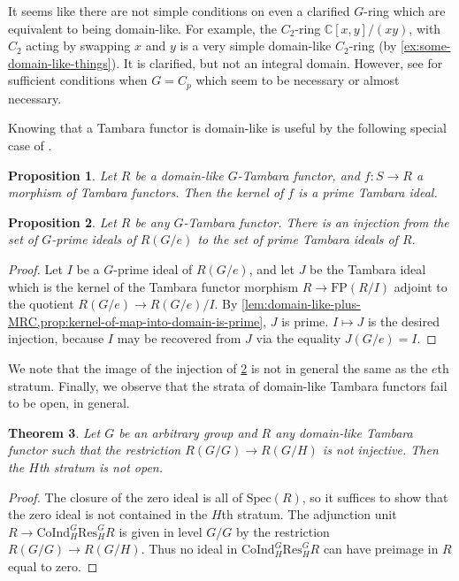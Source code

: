 \documentclass[11pt,dvipsnames]{amsart}
\newtheorem{theorem}{Theorem}[section]
\newtheorem{proposition}[theorem]{Proposition}
\theoremstyle{BoldRemark}
\newcommand{\Res}{\mathrm{Res}}
\newcommand{\Spec}{\mathrm{Spec}}
\newcommand{\Coind}{\mathrm{CoInd}}
\begin{document}
It seems like there are not simple conditions on even a clarified $G$-ring which are equivalent to being domain-like. For example, the $C_2$-ring $\mathbb{C}[x,y]/(xy)$, with $C_2$ acting by swapping $x$ and $y$ is a very simple domain-like $C_2$-ring (by \cref{ex:some-domain-like-things}). It is clarified, but not an integral domain. However, see \cite[Proposition 7.27]{4DS} for sufficient conditions when $G = C_p$ which seem to be necessary or almost necessary.

Knowing that a Tambara functor is domain-like is useful by the following special case of \cite[Theorem 4.9]{Nak11a}.

\begin{proposition}\label{prop:kernel-of-map-into-domain-is-prime}
	Let $R$ be a domain-like $G$-Tambara functor, and $f : S \rightarrow R$ a morphism of Tambara functors. Then the kernel of $f$ is a prime Tambara ideal.
\end{proposition}

\begin{proposition}\label{prop:inj-from-spec-to-spec}
	Let $R$ be any $G$-Tambara functor. There is an injection from the set of $G$-prime ideals of $R(G/e)$ to the set of prime Tambara ideals of $R$.
\end{proposition}

\begin{proof}
	Let $I$ be a $G$-prime ideal of $R(G/e)$, and let $J$ be the Tambara ideal which is the kernel of the Tambara functor morphism $R \rightarrow \mathrm{FP}(R/I)$ adjoint to the quotient $R(G/e) \rightarrow R(G/e)/I$. By \cref{lem:domain-like-plus-MRC,prop:kernel-of-map-into-domain-is-prime}, $J$ is prime. $I \mapsto J$ is the desired injection, because $I$ may be recovered from $J$ via the equality $J(G/e) = I$.
\end{proof}

We note that the image of the injection of \cref{prop:inj-from-spec-to-spec} is not in general the same as the $e$th stratum. Finally, we observe that the strata of domain-like Tambara functors fail to be open, in general.

\begin{theorem}\label{thm:strata-usually-not-open-in-domain-like}
    Let $G$ be an arbitrary group and $R$ any domain-like Tambara functor such that the restriction $R(G/G) \rightarrow R(G/H)$ is not injective. Then the $H$th stratum is not open.
\end{theorem}

\begin{proof}
    The closure of the zero ideal is all of $\Spec(R)$, so it suffices to show that the zero ideal is not contained in the $H$th stratum. The adjunction unit $R \rightarrow \Coind_H^G \Res_H^G R$ is given in level $G/G$ by the restriction $R(G/G) \rightarrow R(G/H)$. Thus no ideal in $\Coind_H^G \Res_H^G R$ can have preimage in $R$ equal to zero.
\end{proof}
\end{document}

